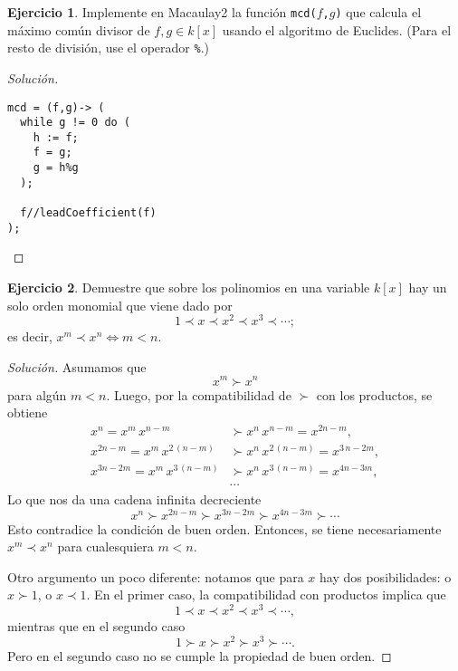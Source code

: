 \documentclass{article}
\theoremstyle{definition}
\newtheorem{ejerc}{Ejercicio}
\newenvironment{solucion}{\begin{proof}[Solución]}{\end{proof}}
\begin{document}
\pagestyle{empty}


\begin{ejerc}
  Implemente en Macaulay2 la función \texttt{mcd($f$,$g$)} que calcula el máximo
  común divisor de $f,g \in k[x]$ usando el algoritmo de Euclides.
  (Para el resto de división, use el operador \verb|%|.)

  \ifdefined\solutions\begin{solucion}
    ~

\begin{verbatim}
mcd = (f,g)-> (
  while g != 0 do (
    h := f;
    f = g;
    g = h%g
  );

  f//leadCoefficient(f)
);
\end{verbatim}

  \end{solucion}\fi
\end{ejerc}

\begin{ejerc}
  Demuestre que sobre los polinomios en una variable $k [x]$ hay un solo orden
  monomial que viene dado por
  $$1 \prec x \prec x^2 \prec x^3 \prec \cdots;$$
  es decir, $x^m \prec x^n \iff m < n$.

  \ifdefined\solutions\begin{solucion}
    Asumamos que
    $$x^m \succ x^n$$
    para algún $m < n$. Luego, por la compatibilidad de $\succ$ con los
    productos, se obtiene
    \begin{align*}
      x^n = x^m\,x^{n-m} & \succ x^n\,x^{n-m} = x^{2n - m},\\
      x^{2n - m} = x^m\,x^{2\,(n-m)} & \succ x^n\,x^{2\,(n-m)} = x^{3\,n - 2m},\\
      x^{3n - 2m} = x^{m}\,x^{3\,(n-m)} & \succ x^n\,x^{3\,(n-m)} = x^{4n - 3m},\\
                         & \cdots
    \end{align*}
    Lo que nos da una cadena infinita decreciente
    $$x^n \succ x^{2n-m} \succ x^{3n-2m} \succ x^{4n-3m} \succ \cdots$$
    Esto contradice la condición de buen orden. Entonces, se tiene
    necesariamente $x^m \prec x^n$ para cualesquiera $m < n$.

    \vspace{1em}

    Otro argumento un poco diferente: notamos que para $x$ hay dos
    posibilidades: o $x \succ 1$, o $x \prec 1$. En el primer caso, la
    compatibilidad con productos implica que
    $$1 \prec x \prec x^2 \prec x^3 \prec \cdots,$$
    mientras que en el segundo caso
    $$1 \succ x \succ x^2 \succ x^3 \succ \cdots.$$
    Pero en el segundo caso no se cumple la propiedad de buen orden.
  \end{solucion}\fi
\end{ejerc}
\end{document}
